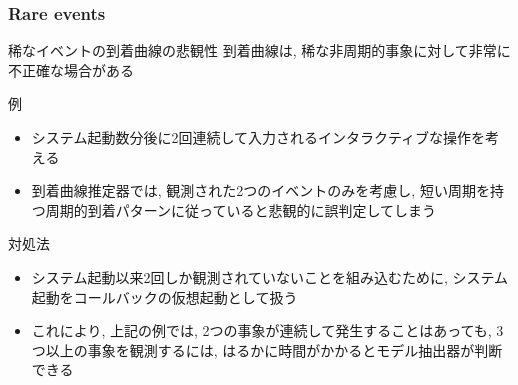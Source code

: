 \subsubsection{Rare events}
\label{sssec: rare events}

\begin{frame}{稀なイベントの到着曲線の悲観性}
    到着曲線は, 稀な非周期的事象に対して非常に不正確な場合がある
    \begin{block}{例}
    \setlength{\linewidth}{0.98\columnwidth}
    \begin{itemize}
        \item システム起動数分後に2回連続して入力されるインタラクティブな操作を考える
        \item 到着曲線推定器では, 観測された2つのイベントのみを考慮し, 短い周期を持つ周期的到着パターンに従っていると悲観的に誤判定してしまう
    \end{itemize}
    \end{block}
\end{frame}

\begin{frame}{対処法}
    \begin{itemize}
        \item システム起動以来2回しか観測されていないことを組み込むために, システム起動をコールバックの仮想起動として扱う
        \item これにより, 上記の例では, 2つの事象が連続して発生することはあっても, 3つ以上の事象を観測するには, はるかに時間がかかるとモデル抽出器が判断できる
    \end{itemize}
\end{frame}
